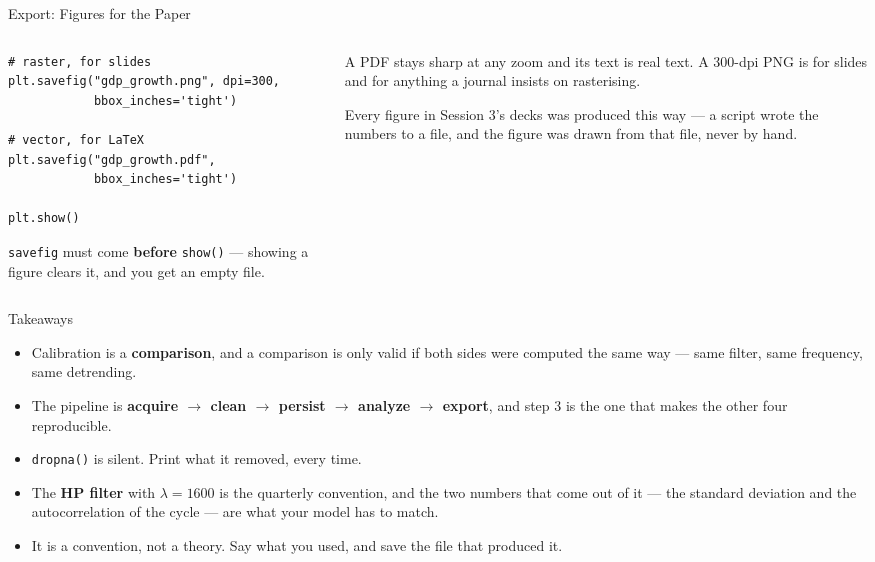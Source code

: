 \begin{frame}[fragile]{Export: Figures for the Paper}
\begin{columns}[T]
\begin{column}{0.50\textwidth}
\begin{lstlisting}
# raster, for slides
plt.savefig("gdp_growth.png", dpi=300,
            bbox_inches='tight')

# vector, for LaTeX
plt.savefig("gdp_growth.pdf",
            bbox_inches='tight')

plt.show()
\end{lstlisting}
\vspace{-1mm}
\small
\texttt{savefig} must come \textbf{before} \texttt{show()} --- showing a figure clears it, and you get an empty file.
\end{column}
\begin{column}{0.47\textwidth}
\begin{takeawaybox}[title=\textbf{Vector for a paper, always}]\small
A PDF stays sharp at any zoom and its text is real text. A 300-dpi PNG is for slides and for anything a journal insists on rasterising.
\end{takeawaybox}
\medskip
\begin{examplebox}\footnotesize
Every figure in Session 3's decks was produced this way --- a script wrote the numbers to a file, and the figure was drawn from that file, never by hand.
\end{examplebox}
\end{column}
\end{columns}
\vspace{1mm}
\end{frame}

\begin{frame}{Takeaways}
\begin{takeawaybox}
\begin{itemize}\small
  \item Calibration is a \textbf{comparison}, and a comparison is only valid if both sides were computed the same way --- same filter, same frequency, same detrending.
  \item The pipeline is \textbf{acquire $\to$ clean $\to$ persist $\to$ analyze $\to$ export}, and step 3 is the one that makes the other four reproducible.
  \item \texttt{dropna()} is silent. Print what it removed, every time.
  \item The \textbf{HP filter} with $\lambda=1600$ is the quarterly convention, and the two numbers that come out of it --- the standard deviation and the autocorrelation of the cycle --- are what your model has to match.
  \item It is a convention, not a theory. Say what you used, and save the file that produced it.
\end{itemize}
\end{takeawaybox}
\end{frame}

